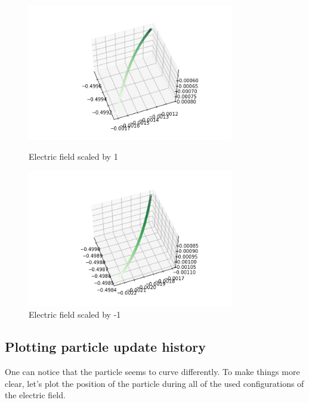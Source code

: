 \documentclass[12pt]{article}
\begin{document}
\begin{figure}[H]
	\begin{multicols}{2}
		\includegraphics[width=\linewidth, height=6cm]{EplusPs1.png} \caption{Electric field scaled by 1} \par
		\includegraphics[width=\linewidth, height=6cm]{EminusPs1.png} \caption{Electric field scaled by -1} \par
	\end{multicols}
\end{figure}

	\subsection{Plotting particle update history}
	One can notice that the particle seems to curve differently. To make things more clear, let's plot the position of the particle during all of the used configurations of the electric field. 
	
\end{document}
